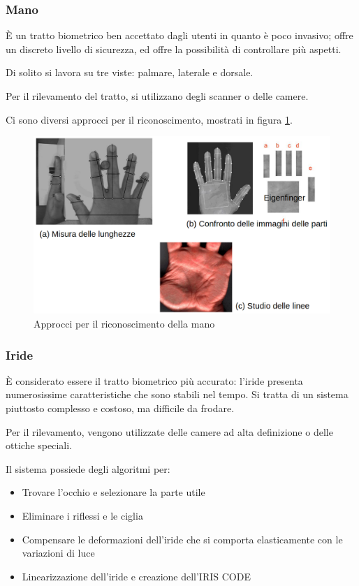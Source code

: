 \subsubsection{Mano}

È un tratto biometrico ben accettato dagli utenti in quanto è poco invasivo; offre un discreto livello di sicurezza, ed offre la possibilità di controllare più aspetti.

Di solito si lavora su tre viste: palmare, laterale e dorsale.

Per il rilevamento del tratto, si utilizzano degli scanner o delle camere.

Ci sono diversi approcci per il riconoscimento, mostrati in figura \ref{fig:mano}.

\begin{figure}
    \centering
    \includegraphics[width=1\linewidth]{chapters/images-chap1/mano.png}
    \caption{Approcci per il riconoscimento della mano}
    \label{fig:mano}
\end{figure}

\newpage

\subsubsection{Iride}

È considerato essere il tratto biometrico più accurato: l'iride presenta numerosissime caratteristiche che sono stabili nel tempo. Si tratta di un sistema piuttosto complesso e costoso, ma difficile da frodare.

Per il rilevamento, vengono utilizzate delle camere ad alta definizione o delle ottiche speciali.

Il sistema possiede degli algoritmi per:
\begin{itemize}
    \item Trovare l'occhio e selezionare la parte utile
    \item Eliminare i riflessi e le ciglia
    \item Compensare le deformazioni dell'iride che si comporta elasticamente con le variazioni di luce
    \item Linearizzazione dell'iride e creazione dell'IRIS CODE
\end{itemize}

